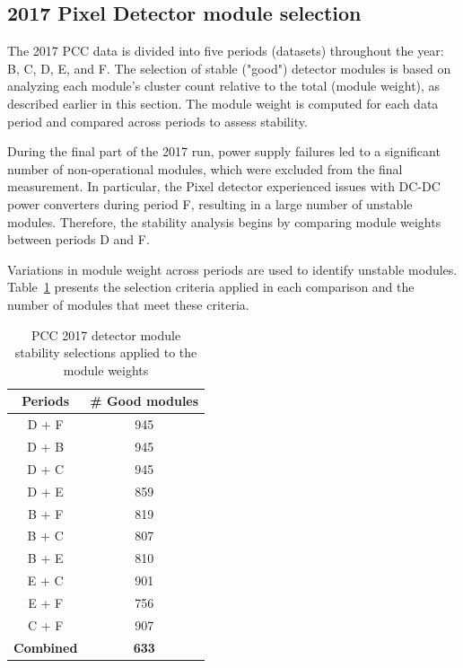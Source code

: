 

\subsection{2017 Pixel Detector module selection}
\label{sec:pcc_perf_moduleselection_2017}



The 2017 PCC data is divided into five periods (datasets) throughout the year: B, C, D, E, and F. The selection of stable ("good") detector modules is based on analyzing each module's cluster count relative to the total (module weight), as described earlier in this section. The module weight is computed for each data period and compared across periods to assess stability.

During the final part of the 2017 run, power supply failures led to a significant number of non-operational modules, which were excluded from the final measurement. In particular, the Pixel detector experienced issues with DC-DC power converters during period F, resulting in a large number of unstable modules. Therefore, the stability analysis begins by comparing module weights between periods D and F.

Variations in module weight across periods are used to identify unstable modules. Table~\ref{tab:pcc_2017_module_selections} presents the selection criteria applied in each comparison and the number of modules that meet these criteria.

\begin{table}[h]
    \caption{PCC 2017 detector module stability selections applied to the module weights}
    \label{tab:pcc_2017_module_selections}
  \begin{center}
    \begin{tabular}{cc}  
    \textbf{Periods}   & \textbf{\# Good modules} \\ \hline
     D + F      & 945           \\ 
     D + B      & 945           \\ 
     D + C      & 945           \\ 
     D + E      & 859           \\ 
     B + F      & 819          \\ 
     B + C      & 807          \\ 
     B + E      & 810          \\ 
     E + C      & 901          \\ 
     E + F      & 756          \\ 
     C + F      & 907          \\ \hline
     \textbf{Combined}   & \textbf{633}  \\ \hline
      \end{tabular}
  \end{center}
\end{table}


